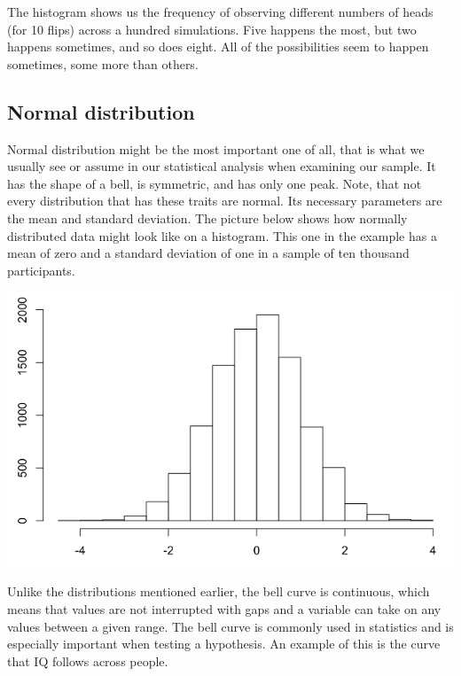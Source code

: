 \documentclass[
]{book}
\begin{document}
The histogram shows us the frequency of observing different numbers of heads (for 10 flips) across a hundred simulations. Five happens the most, but two happens sometimes, and so does eight. All of the possibilities seem to happen sometimes, some more than others.

\hypertarget{normal-distribution}{%
\subsection{Normal distribution}\label{normal-distribution}}

Normal distribution might be the most important one of all, that is what we usually see or assume in our statistical analysis when examining our sample. It has the shape of a bell, is symmetric, and has only one peak. Note, that not every distribution that has these traits are normal. Its necessary parameters are the mean and standard deviation. The picture below shows how normally distributed data might look like on a histogram. This one in the example has a mean of zero and a standard deviation of one in a sample of ten thousand participants.

\includegraphics{img/ch4/4.5normdistr.png}

Unlike the distributions mentioned earlier, the bell curve is continuous, which means that values are not interrupted with gaps and a variable can take on any values between a given range. The bell curve is commonly used in statistics and is especially important when testing a hypothesis. An example of this is the curve that IQ follows across people.
\end{document}
